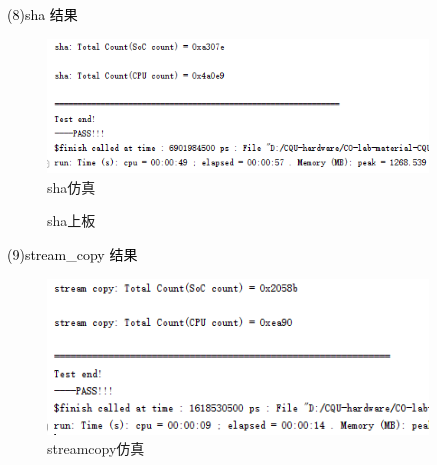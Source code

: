 \textcolor{black}{(8)sha 结果}\\
\begin{figure}[htbp]
    \centering
    \includegraphics[width=0.9\textwidth]{image/shaS.png}
    \caption{sha仿真}
\end{figure}

\begin{figure}[htbp]
    \centering
    \caption{sha上板}
\end{figure}

\textcolor{black}{(9)stream\_copy 结果}\\
\begin{figure}[htbp]
    \centering
    \includegraphics[width=0.9\textwidth]{image/streamcopyS.png}
    \caption{streamcopy仿真}
\end{figure}

